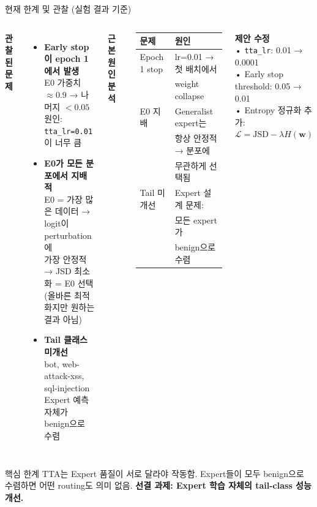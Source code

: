 \documentclass[aspectratio=169]{beamer}
\begin{document}
\begin{frame}{현재 한계 및 관찰 (실험 결과 기준)}

\begin{columns}[T]
\textbf{관찰된 문제}

\begin{itemize}
  \item \textbf{Early stop이 epoch 1에서 발생}\\
        E0 가중치 $\approx 0.9$ → 나머지 $< 0.05$\\
        원인: \texttt{tta\_lr=0.01}이 너무 큼

  \item \textbf{E0가 모든 분포에서 지배적}\\
        E0 = 가장 많은 데이터 → logit이 perturbation에\\
        가장 안정적 → JSD 최소화 = E0 선택\\
        {\small(올바른 최적화지만 원하는 결과 아님)}

  \item \textbf{Tail 클래스 미개선}\\
        bot, web-attack-xss, sql-injection\\
        Expert 예측 자체가 benign으로 수렴
\end{itemize}

\textbf{근본 원인 분석}

\begin{tabular}{p{2cm}p{3.5cm}}
\toprule
문제 & 원인 \\
\midrule
Epoch 1 stop & lr=0.01 → 첫 배치에서\\
             & weight collapse \\
\midrule
E0 지배      & Generalist expert는\\
             & 항상 안정적 → 분포에\\
             & 무관하게 선택됨 \\
\midrule
Tail 미개선  & Expert 설계 문제:\\
             & 모든 expert가\\
             & benign으로 수렴 \\
\bottomrule
\end{tabular}

\vspace{0.4em}
\textbf{제안 수정}\\
{\small
• \texttt{tta\_lr}: 0.01 → 0.0001\\
• Early stop threshold: 0.05 → 0.01\\
• Entropy 정규화 추가:\\
  $\mathcal{L} = \text{JSD} - \lambda H(\mathbf{w})$
}
\end{columns}

\vspace{0.3em}
\begin{alertblock}{\small 핵심 한계}
\small TTA는 Expert 품질이 서로 달라야 작동함.
Expert들이 모두 benign으로 수렴하면 어떤 routing도 의미 없음.
\textbf{선결 과제: Expert 학습 자체의 tail-class 성능 개선.}
\end{alertblock}
\end{frame}
\end{document}
